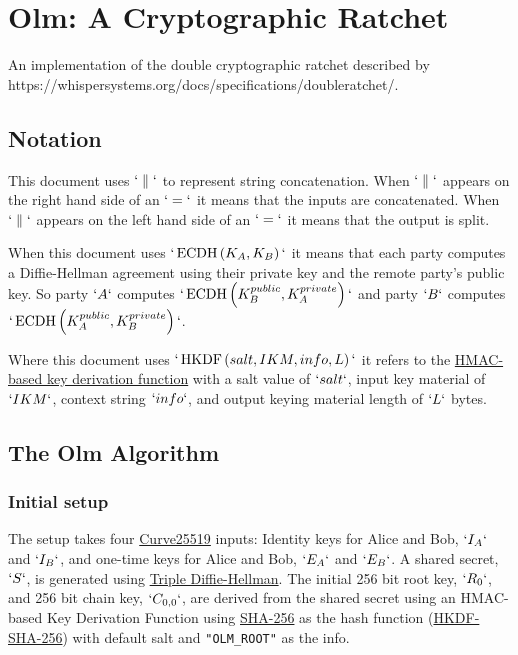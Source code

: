 \documentclass[10pt]{article}
\begin{document}
\section{Olm: A Cryptographic Ratchet}\label{olm-a-cryptographic-ratchet}

An implementation of the double cryptographic ratchet described by
https://whispersystems.org/docs/specifications/doubleratchet/.

\subsection{Notation}\label{notation}

This document uses \(`\parallel`\) to represent string concatenation.
When \(`\parallel`\) appears on the right hand side of an \(`=`\) it
means that the inputs are concatenated. When \(`\parallel`\) appears on
the left hand side of an \(`=`\) it means that the output is split.

When this document uses \(`\operatorname{ECDH}\left(K_A,K_B\right)`\) it
means that each party computes a Diffie-Hellman agreement using their
private key and the remote party's public key. So party \(`A`\) computes
\(`\operatorname{ECDH}\left(K_B^{public},K_A^{private}\right)`\) and
party \(`B`\) computes
\(`\operatorname{ECDH}\left(K_A^{public},K_B^{private}\right)`\).

Where this document uses
\(`\operatorname{HKDF}\left(salt,IKM,info,L\right)`\) it refers to the
\href{https://tools.ietf.org/html/rfc5869}{HMAC-based key derivation
function} with a salt value of \(`salt`\), input key material of
\(`IKM`\), context string \(`info`\), and output keying material length
of \(`L`\) bytes.

\subsection{The Olm Algorithm}\label{the-olm-algorithm}

\subsubsection{Initial setup}\label{initial-setup}

The setup takes four \href{http://cr.yp.to/ecdh.html}{Curve25519}
inputs: Identity keys for Alice and Bob, \(`I_A`\) and \(`I_B`\), and
one-time keys for Alice and Bob, \(`E_A`\) and \(`E_B`\). A shared
secret, \(`S`\), is generated using
\href{https://whispersystems.org/blog/simplifying-otr-deniability/}{Triple
Diffie-Hellman}. The initial 256 bit root key, \(`R_0`\), and 256 bit
chain key, \(`C_{0,0}`\), are derived from the shared secret using an
HMAC-based Key Derivation Function using
\href{https://tools.ietf.org/html/rfc6234}{SHA-256} as the hash function
(\href{https://tools.ietf.org/html/rfc5869}{HKDF-SHA-256}) with default
salt and \texttt{"OLM\_ROOT"} as the info.
\end{document}
